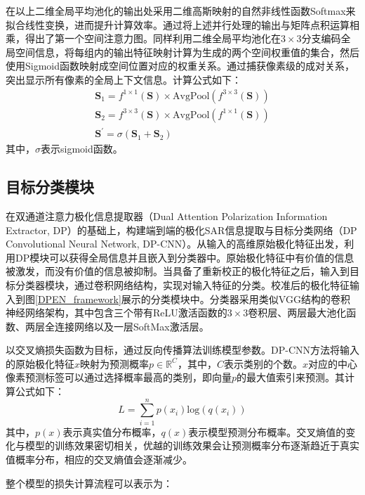 在以上二维全局平均池化的输出处采用二维高斯映射的自然非线性函数Softmax来拟合线性变换，进而提升计算效率。通过将上述并行处理的输出与矩阵点积运算相乘，得出了第一个空间注意力图。同样利用二维全局平均池化在$3\times 3$分支编码全局空间信息，将每组内的输出特征映射计算为生成的两个空间权重值的集合，然后使用Sigmoid函数映射成空间位置对应的权重关系。通过捕获像素级的成对关系，突出显示所有像素的全局上下文信息。计算公式如下：
\begin{gather}
    \textbf{S}_1=f^{1\times 1}\left( \textbf{S} \right) \times \mathrm{AvgPool}\left( f^{3\times 3}\left( \textbf{S} \right) \right)
    \\
    \textbf{S}_2=f^{3\times 3}\left( \textbf{S} \right) \times \mathrm{AvgPool}\left( f^{1\times 1}\left( \textbf{S} \right) \right)
    \\
    \textbf{S}^{\prime}=\sigma \left( \textbf{S}_1+\textbf{S}_2 \right)
\end{gather}
其中，$\sigma$表示sigmoid函数。

\subsection{目标分类模块}
\label{sec:目标分类模块}
在双通道注意力极化信息提取器（Dual Attention Polarization Information Extractor, DP）的基础上，构建端到端的极化SAR信息提取与目标分类网络（DP Convolutional Neural Network, DP-CNN）。从输入的高维原始极化特征出发，利用DP模块可以获得全局信息并且嵌入到分类器中。原始极化特征中有价值的信息被激发，而没有价值的信息被抑制。当具备了重新校正的极化特征之后，输入到目标分类器模块，通过卷积网络结构，实现对输入特征的分类。校准后的极化特征输入到图\ref{DPEN_framework}展示的分类模块中。分类器采用类似VGG结构的卷积神经网络架构，其中包含三个带有ReLU激活函数的$3\times 3$卷积层、两层最大池化函数、两层全连接网络以及一层SoftMax激活层。

以交叉熵损失函数为目标，通过反向传播算法训练模型参数。DP-CNN方法将输入的原始极化特征$x$映射为预测概率$p\in \mathbb{R}^{C}$，其中，$C$表示类别的个数。$x$对应的中心像素预测标签可以通过选择概率最高的类别，即向量$p$的最大值索引来预测。其计算公式如下：
\begin{equation}
    L=\sum_{i=1}^{n}p(x_i)\text{log}(q(x_i))
\end{equation}
其中，$p(x)$表示真实值分布概率，$q(x)$表示模型预测分布概率。交叉熵值的变化与模型的训练效果密切相关，优越的训练效果会让预测概率分布逐渐趋近于真实值概率分布，相应的交叉熵值会逐渐减少。

整个模型的损失计算流程可以表示为：

